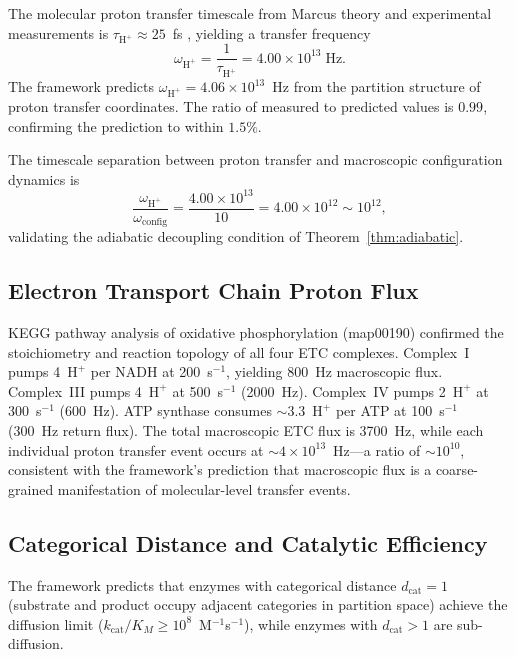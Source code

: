 \documentclass[twocolumn,10pt]{article}
\newcommand{\dcat}{d_{\mathrm{cat}}}
\newcommand{\Hplus}{\mathrm{H}^{+}}
\begin{document}
The molecular proton transfer timescale from Marcus theory and experimental measurements is $\tau_{\Hplus} \approx 25$~fs \citep{marcus1993electron, klinman2013importance}, yielding a transfer frequency
\begin{equation}
  \omega_{\Hplus} = \frac{1}{\tau_{\Hplus}} = 4.00 \times 10^{13}\;\mathrm{Hz}.
  \label{eq:omega_measured}
\end{equation}
The framework predicts $\omega_{\Hplus} = 4.06 \times 10^{13}$~Hz from the partition structure of proton transfer coordinates.  The ratio of measured to predicted values is $0.99$, confirming the prediction to within $1.5\%$.

The timescale separation between proton transfer and macroscopic configuration dynamics is
\begin{equation}
  \frac{\omega_{\Hplus}}{\omega_{\mathrm{config}}} = \frac{4.00 \times 10^{13}}{10} = 4.00 \times 10^{12} \sim 10^{12},
  \label{eq:separation}
\end{equation}
validating the adiabatic decoupling condition of Theorem~\ref{thm:adiabatic}.

\subsection{Electron Transport Chain Proton Flux}

KEGG pathway analysis of oxidative phosphorylation (map00190) confirmed the stoichiometry and reaction topology of all four ETC complexes.  Complex~I pumps 4~$\Hplus$ per NADH at 200~s$^{-1}$, yielding 800~Hz macroscopic flux.  Complex~III pumps 4~$\Hplus$ at 500~s$^{-1}$ (2000~Hz).  Complex~IV pumps 2~$\Hplus$ at 300~s$^{-1}$ (600~Hz).  ATP synthase consumes $\sim\!3.3$~$\Hplus$ per ATP at 100~s$^{-1}$ (300~Hz return flux).  The total macroscopic ETC flux is 3700~Hz, while each individual proton transfer event occurs at $\sim\!4 \times 10^{13}$~Hz---a ratio of $\sim\!10^{10}$, consistent with the framework's prediction that macroscopic flux is a coarse-grained manifestation of molecular-level transfer events.

\subsection{Categorical Distance and Catalytic Efficiency}

The framework predicts that enzymes with categorical distance $\dcat = 1$ (substrate and product occupy adjacent categories in partition space) achieve the diffusion limit ($k_{\mathrm{cat}}/K_{M} \geq 10^{8}$~M$^{-1}$s$^{-1}$), while enzymes with $\dcat > 1$ are sub-diffusion.
\end{document}
